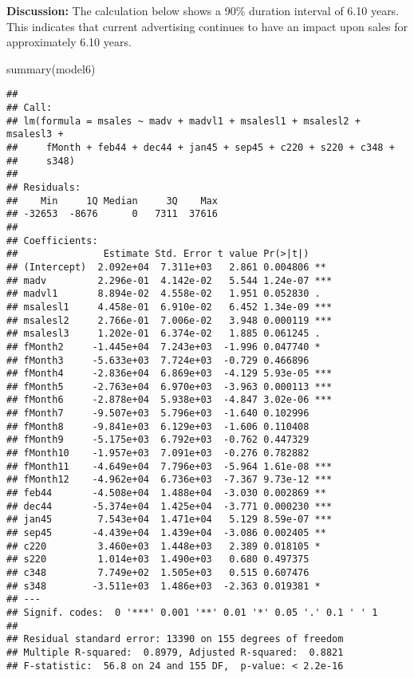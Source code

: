 \documentclass[
]{article}
\newenvironment{Shaded}{\begin{snugshade}}{\end{snugshade}}
\newcommand{\FunctionTok}[1]{\textcolor[rgb]{0.00,0.00,0.00}{#1}}
\newcommand{\NormalTok}[1]{#1}
\begin{document}
\textbf{Discussion:} The calculation below shows a 90\% duration
interval of 6.10 years. This indicates that current advertising
continues to have an impact upon sales for approximately 6.10 years.

\begin{Shaded}
\begin{Highlighting}[]
\FunctionTok{summary}\NormalTok{(model6)}
\end{Highlighting}
\end{Shaded}

\begin{verbatim}
## 
## Call:
## lm(formula = msales ~ madv + madvl1 + msalesl1 + msalesl2 + msalesl3 + 
##     fMonth + feb44 + dec44 + jan45 + sep45 + c220 + s220 + c348 + 
##     s348)
## 
## Residuals:
##    Min     1Q Median     3Q    Max 
## -32653  -8676      0   7311  37616 
## 
## Coefficients:
##               Estimate Std. Error t value Pr(>|t|)    
## (Intercept)  2.092e+04  7.311e+03   2.861 0.004806 ** 
## madv         2.296e-01  4.142e-02   5.544 1.24e-07 ***
## madvl1       8.894e-02  4.558e-02   1.951 0.052830 .  
## msalesl1     4.458e-01  6.910e-02   6.452 1.34e-09 ***
## msalesl2     2.766e-01  7.006e-02   3.948 0.000119 ***
## msalesl3     1.202e-01  6.374e-02   1.885 0.061245 .  
## fMonth2     -1.445e+04  7.243e+03  -1.996 0.047740 *  
## fMonth3     -5.633e+03  7.724e+03  -0.729 0.466896    
## fMonth4     -2.836e+04  6.869e+03  -4.129 5.93e-05 ***
## fMonth5     -2.763e+04  6.970e+03  -3.963 0.000113 ***
## fMonth6     -2.878e+04  5.938e+03  -4.847 3.02e-06 ***
## fMonth7     -9.507e+03  5.796e+03  -1.640 0.102996    
## fMonth8     -9.841e+03  6.129e+03  -1.606 0.110408    
## fMonth9     -5.175e+03  6.792e+03  -0.762 0.447329    
## fMonth10    -1.957e+03  7.091e+03  -0.276 0.782882    
## fMonth11    -4.649e+04  7.796e+03  -5.964 1.61e-08 ***
## fMonth12    -4.962e+04  6.736e+03  -7.367 9.73e-12 ***
## feb44       -4.508e+04  1.488e+04  -3.030 0.002869 ** 
## dec44       -5.374e+04  1.425e+04  -3.771 0.000230 ***
## jan45        7.543e+04  1.471e+04   5.129 8.59e-07 ***
## sep45       -4.439e+04  1.439e+04  -3.086 0.002405 ** 
## c220         3.460e+03  1.448e+03   2.389 0.018105 *  
## s220         1.014e+03  1.490e+03   0.680 0.497375    
## c348         7.749e+02  1.505e+03   0.515 0.607476    
## s348        -3.511e+03  1.486e+03  -2.363 0.019381 *  
## ---
## Signif. codes:  0 '***' 0.001 '**' 0.01 '*' 0.05 '.' 0.1 ' ' 1
## 
## Residual standard error: 13390 on 155 degrees of freedom
## Multiple R-squared:  0.8979, Adjusted R-squared:  0.8821 
## F-statistic:  56.8 on 24 and 155 DF,  p-value: < 2.2e-16
\end{verbatim}
\end{document}
